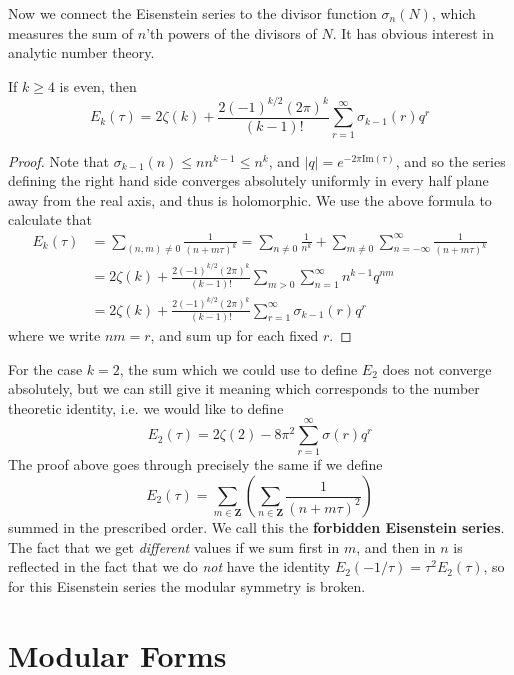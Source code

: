 Now we connect the Eisenstein series to the divisor function $\sigma_n(N)$, which measures the sum of $n$'th powers of the divisors of $N$. It has obvious interest in analytic number theory.

\begin{theorem}
    If $k \geq 4$ is even, then
    \[ E_k(\tau) = 2 \zeta(k) + \frac{2 (-1)^{k/2} (2\pi)^k}{(k-1)!} \sum_{r = 1}^\infty \sigma_{k-1}(r) q^r \]
\end{theorem}
\begin{proof}
    Note that $\sigma_{k-1}(n) \leq nn^{k-1} \leq n^k$, and $|q| = e^{-2 \pi \text{Im}(\tau)}$, and so the series defining the right hand side converges absolutely uniformly in every half plane away from the real axis, and thus is holomorphic. We use the above formula to calculate that
    \begin{align*}
        E_k(\tau) &= \sum_{(n,m) \neq 0} \frac{1}{(n + m \tau)^k} = \sum_{n \neq 0} \frac{1}{n^k} + \sum_{m \neq 0} \sum_{n = -\infty}^\infty \frac{1}{(n + m \tau)^k}\\
        &= 2 \zeta(k) + \frac{2 (-1)^{k/2} (2\pi)^k}{(k - 1)!} \sum_{m > 0} \sum_{n = 1}^\infty n^{k-1} q^{nm}\\
        &= 2 \zeta(k) + \frac{2 (-1)^{k/2} (2 \pi)^k}{(k-1)!} \sum_{r = 1}^\infty \sigma_{k-1}(r) q^r
    \end{align*}
    where we write $nm = r$, and sum up for each fixed $r$.
\end{proof}

For the case $k = 2$, the sum which we could use to define $E_2$ does not converge absolutely, but we can still give it meaning which corresponds to the number theoretic identity, i.e. we would like to define
%
\[ E_2(\tau) = 2 \zeta(2) - 8 \pi^2 \sum_{r = 1}^\infty \sigma(r) q^r \]
%
The proof above goes through precisely the same if we define
%
\[ E_2(\tau) = \sum_{m \in \mathbf{Z}} \left( \sum_{n \in \mathbf{Z}} \frac{1}{(n + m\tau)^2} \right) \]
%
summed in the prescribed order. We call this the {\bf forbidden Eisenstein series}. The fact that we get {\it different} values if we sum first in $m$, and then in $n$ is reflected in the fact that we do {\it not} have the identity $E_2(-1/\tau) = \tau^2 E_2(\tau)$, so for this Eisenstein series the modular symmetry is broken.

\section{Modular Forms}

